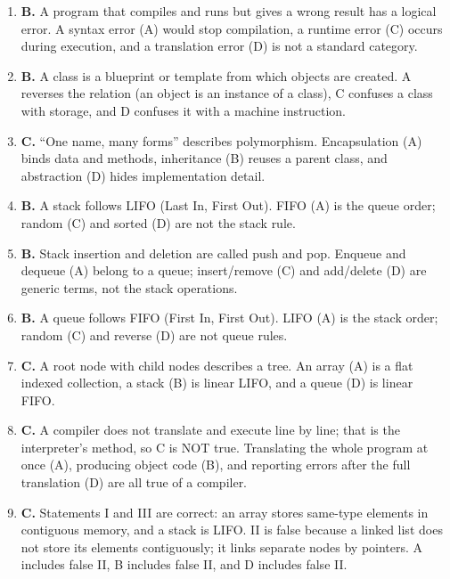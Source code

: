 \begin{enumerate}[label=\textbf{Q\arabic*.}, leftmargin=*]
  is unrelated to error correction.
\item \textbf{B.} A program that compiles and runs but gives a wrong result
  has a logical error. A syntax error (A) would stop compilation, a runtime
  error (C) occurs during execution, and a translation error (D) is not a
  standard category.
\item \textbf{B.} A class is a blueprint or template from which objects are
  created. A reverses the relation (an object is an instance of a class), C
  confuses a class with storage, and D confuses it with a machine
  instruction.
\item \textbf{C.} ``One name, many forms'' describes polymorphism.
  Encapsulation (A) binds data and methods, inheritance (B) reuses a parent
  class, and abstraction (D) hides implementation detail.
\item \textbf{B.} A stack follows LIFO (Last In, First Out). FIFO (A) is the
  queue order; random (C) and sorted (D) are not the stack rule.
\item \textbf{B.} Stack insertion and deletion are called push and pop.
  Enqueue and dequeue (A) belong to a queue; insert/remove (C) and
  add/delete (D) are generic terms, not the stack operations.
\item \textbf{B.} A queue follows FIFO (First In, First Out). LIFO (A) is the
  stack order; random (C) and reverse (D) are not queue rules.
\item \textbf{C.} A root node with child nodes describes a tree. An array
  (A) is a flat indexed collection, a stack (B) is linear LIFO, and a queue
  (D) is linear FIFO.
\item \textbf{C.} A compiler does not translate and execute line by line;
  that is the interpreter's method, so C is NOT true. Translating the whole
  program at once (A), producing object code (B), and reporting errors after
  the full translation (D) are all true of a compiler.
\item \textbf{C.} Statements I and III are correct: an array stores same-type
  elements in contiguous memory, and a stack is LIFO. II is false because a
  linked list does not store its elements contiguously; it links separate
  nodes by pointers. A includes false II, B includes false II, and D includes
  false II.


\end{enumerate}
